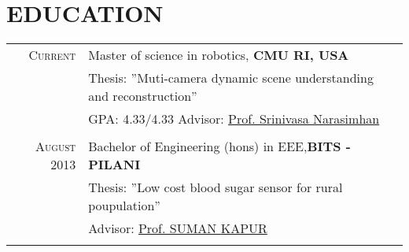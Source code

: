 \documentclass[a4paper,10pt]{article}
\begin{document}
\section{EDUCATION}
\begin{tabular}{rl}	
 \textsc{Current}  & Master of science in robotics, \bf{CMU RI, USA}\\
& Thesis: ''Muti-camera dynamic scene understanding and reconstruction'' \\
 
 & GPA: 4.33/4.33 \small Advisor: \href{http://www.cs.cmu.edu/~srinivas/} {Prof. Srinivasa Narasimhan} \\&\\



\textsc{August} 2013& Bachelor of Engineering (hons) in \textsc{EEE},\normalsize\textbf{BITS - PILANI}\\
& Thesis: ''Low cost blood sugar sensor for rural poupulation'' \\
&\normalsize \small Advisor: 
\href{http://www.bits-pilani.ac.in/Hyderabad/sumankapur/Profile} {Prof. SUMAN \textsc{KAPUR}}\\&\\

\end{tabular}
\end{document}
